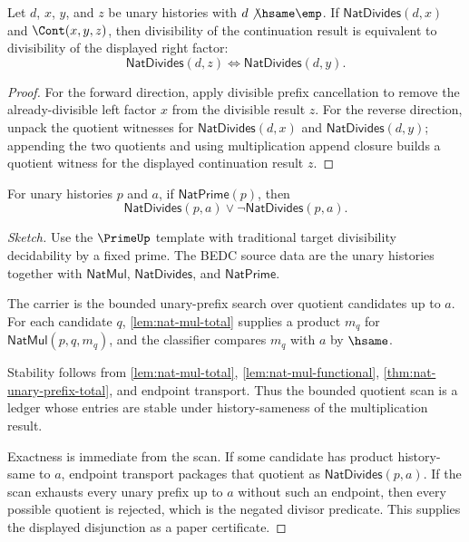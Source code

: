 \begin{theorem}
\label{thm:nat-divides-cont-right-factor-iff}
Let $d$, $x$, $y$, and $z$ be unary histories with $d\not\hsame\emp$. If
$\mathsf{NatDivides}(d,x)$ and $\Cont(x,y,z)$, then divisibility of the
continuation result is equivalent to divisibility of the displayed right
factor:
$$
\mathsf{NatDivides}(d,z)\Longleftrightarrow\mathsf{NatDivides}(d,y).
$$
\end{theorem}
\begin{proof}
For the forward direction, apply divisible prefix cancellation to remove the
already-divisible left factor $x$ from the divisible result $z$. For the
reverse direction, unpack the quotient witnesses for
$\mathsf{NatDivides}(d,x)$ and $\mathsf{NatDivides}(d,y)$; appending the two
quotients and using multiplication append closure builds a quotient witness
for the displayed continuation result $z$.
\end{proof}

\begin{theorem}
\label{thm:prime-divisor-dichotomy}
For unary histories $p$ and $a$, if $\mathsf{NatPrime}(p)$, then
$$
  \mathsf{NatDivides}(p,a) \vee \neg\mathsf{NatDivides}(p,a).
$$
\end{theorem}
\begin{proof}[Sketch]
Use the $\PrimeUp$ template with traditional target divisibility
decidability by a fixed prime. The BEDC source data are the unary histories
together with $\mathsf{NatMul}$, $\mathsf{NatDivides}$, and
$\mathsf{NatPrime}$.

The carrier is the bounded unary-prefix search over quotient candidates up to
$a$. For each candidate $q$, \autoref{lem:nat-mul-total} supplies a product
$m_q$ for $\mathsf{NatMul}(p,q,m_q)$, and the classifier compares $m_q$ with
$a$ by $\hsame$.

Stability follows from \autoref{lem:nat-mul-total},
\autoref{lem:nat-mul-functional}, \autoref{thm:nat-unary-prefix-total}, and
endpoint transport. Thus the bounded quotient scan is a ledger whose entries
are stable under history-sameness of the multiplication result.

Exactness is immediate from the scan. If some candidate has product
history-same to $a$, endpoint transport packages that quotient as
$\mathsf{NatDivides}(p,a)$. If the scan exhausts every unary prefix up to $a$
without such an endpoint, then every possible quotient is rejected, which is
the negated divisor predicate. This supplies the displayed disjunction as a
paper certificate.
\end{proof}


